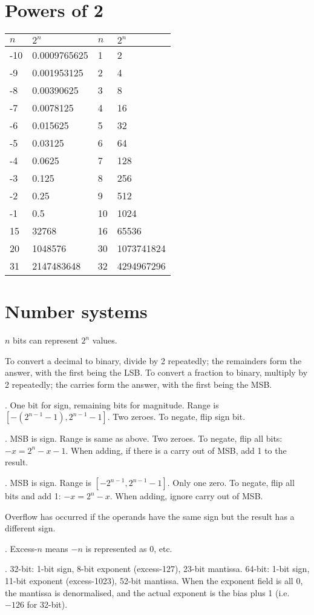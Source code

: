 \documentclass{slnotes}
\begin{document}
\chapter{Powers of 2}
\begin{tabular}{llll}
\toprule
\(n\) & \(2^n\) & \(n\) & \(2^n\) \tabularnewline
\midrule
-10 & 0.0009765625 & 1 & 2 \tabularnewline
-9  & 0.001953125  & 2 & 4 \tabularnewline
-8  & 0.00390625   & 3 & 8 \tabularnewline
-7  & 0.0078125    & 4 & 16 \tabularnewline
-6  & 0.015625     & 5 & 32 \tabularnewline
-5  & 0.03125      & 6 & 64 \tabularnewline
-4  & 0.0625       & 7 & 128 \tabularnewline
-3  & 0.125        & 8 & 256 \tabularnewline
-2  & 0.25         & 9 & 512 \tabularnewline
-1  & 0.5          & 10 & 1024 \tabularnewline
15 & 32768         & 16 & 65536 \tabularnewline
20 & 1048576       & 30 & 1073741824 \tabularnewline
31 & 2147483648    & 32 & 4294967296 \tabularnewline
\bottomrule
\end{tabular}
\chapter{Number systems}
\(n\) bits can represent \(2^n\) values.

To convert a decimal to binary, divide by 2 repeatedly; the remainders form the answer, with the first being the LSB. To convert a fraction to binary, multiply by 2 repeatedly; the carries form the answer, with the first being the MSB.

. One bit for sign, remaining bits for magnitude. Range is \([-(2^{n-1}-1), 2^{n-1}-1]\). Two zeroes. To negate, flip sign bit.

. MSB is sign. Range is same as above. Two zeroes. To negate, flip all bits: \(-x = 2^n - x - 1\). When adding, if there is a carry out of MSB, add 1 to the result.

. MSB is sign. Range is \([-2^{n-1}, 2^{n-1}-1]\). Only one zero. To negate, flip all bits and add 1: \(-x = 2^n - x\). When adding, ignore carry out of MSB.

Overflow has occurred if the operands have the same sign but the result has a different sign.

. Excess-\(n\) means \(-n\) is represented as 0, etc.

. 32-bit: 1-bit sign, 8-bit exponent (excess-127), 23-bit mantissa. 64-bit: 1-bit sign, 11-bit exponent (excess-1023), 52-bit mantissa. When the exponent field is all 0, the mantissa is denormalised, and the actual exponent is the bias plus 1 (i.e. \(-126\) for 32-bit).
\end{document}
